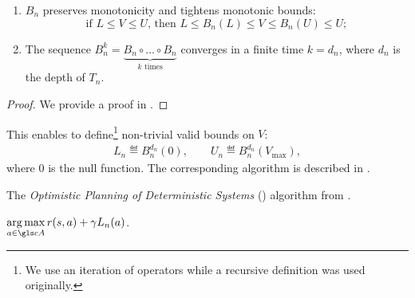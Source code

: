 \begin{lemma}[Properties of $B_n$]
	\begin{leftbar}[lemmabar]
	\label{lem:properties-b-tree}
	\leavevmode\newline
	\begin{enumerate}[label=(\roman*)]
		\item $B_n$ preserves monotonicity and tightens monotonic bounds: $$
		\text{if } L\leq V\leq U \text{, then } L \leq B_n(L) \leq V \leq B_n(U) \leq U;
		$$
		\item The sequence $B_n^k = \underbrace{B_n \circ \dots\circ B_n}_{\text{$k$ times}} $ converges in a finite time $k=d_n$, where $d_n$ is the depth of $T_n$. 
	\end{enumerate}
	\end{leftbar}
\end{lemma}
\begin{proof}
	We provide a proof in .
\end{proof}
This enables \citet{Hren2008} to define\footnote{We use an iteration of operators while a recursive definition was used originally.} non-trivial valid bounds on $V$:
\begin{align}
\label{eq:opd-bounds}
L_n \eqdef B_n^{d_n}(0), \qquad U_n \eqdef B_n^{d_n}(V_{\max}),
\end{align}
where $0$ is the null function.
The corresponding \OPD algorithm is described in .

\begin{algorithm}[!ht]
	\caption{The \emph{Optimistic Planning of Deterministic Systems} (\OPD) algorithm from \citep{Hren2008}.}
	\label{alg:opd}
	\DontPrintSemicolon
	\Return $\displaystyle\argmax_{a\in \cA} r(s, a) + \gamma L_n(a)$. \;
\end{algorithm}


